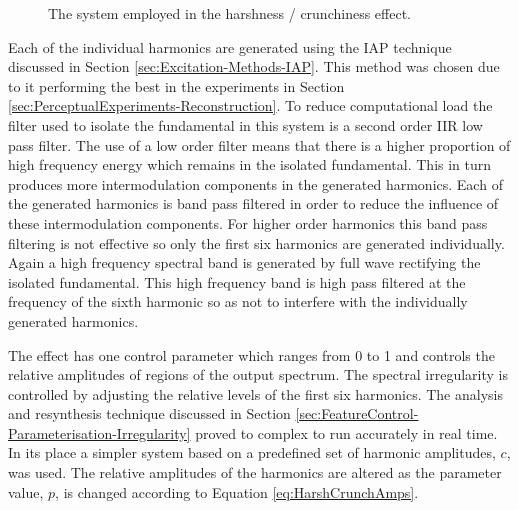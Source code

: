\begin{figure}[h!]
				\caption{The system employed in the harshness / crunchiness effect.}
				\label{fig:HarshCrunch}
			\end{figure}

			Each of the individual harmonics are generated using the IAP technique discussed in Section
			\ref{sec:Excitation-Methods-IAP}. This method was chosen due to it performing the best in the
			experiments in Section \ref{sec:PerceptualExperiments-Reconstruction}. To reduce computational load
			the filter used to isolate the fundamental in this system is a second order IIR low pass filter.
			The use of a low order filter means that there is a higher proportion of high frequency energy which
			remains in the isolated fundamental. This in turn produces more intermodulation components in the
			generated harmonics. Each of the generated harmonics is band pass filtered in order to reduce the
			influence of these intermodulation components. For higher order harmonics this band pass filtering
			is not effective so only the first six harmonics are generated individually. Again a high frequency
			spectral band is generated by full wave rectifying the isolated fundamental. This high frequency
			band is high pass filtered at the frequency of the sixth harmonic so as not to interfere with the
			individually generated harmonics.

			The effect has one control parameter which ranges from 0 to 1 and controls the relative amplitudes
			of regions of the output spectrum. The spectral irregularity is controlled by adjusting the
			relative levels of the first six harmonics. The analysis and resynthesis technique discussed in
			Section \ref{sec:FeatureControl-Parameterisation-Irregularity} proved to complex to run accurately
			in real time. In its place a simpler system based on a predefined set of harmonic amplitudes,
			$c$, was used. The relative amplitudes of the harmonics are altered as the parameter value, $p$,
			is changed according to Equation \ref{eq:HarshCrunchAmps}.

